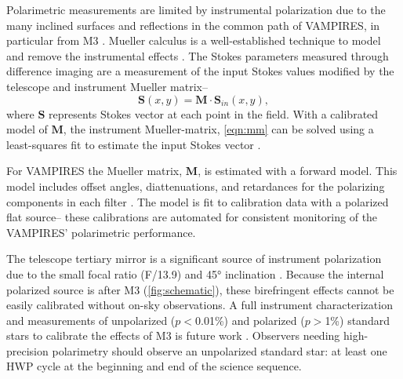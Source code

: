 Polarimetric measurements are limited by instrumental polarization due to the many inclined surfaces and reflections in the common path of VAMPIRES, in particular from M3 \citep{tinbergen_accurate_2007}. Mueller calculus is a well-established technique to model and remove the instrumental effects \citep{perrin_polarimetry_2015,holstein_polarimetric_2020,joost_t_hart_full_2021}. The Stokes parameters measured through difference imaging are a measurement of the input Stokes values modified by the telescope and instrument Mueller matrix--
\begin{equation}
    \mathbf{S}(x, y) = \mathbf{M}\cdot\mathbf{S}_{in}(x, y),
    \label{eqn:mm}
\end{equation}
where $\mathbf{S}$ represents Stokes vector at each point in the field. With a calibrated model of $\mathbf{M}$, the instrument Mueller-matrix, \autoref{eqn:mm} can be solved using a least-squares fit to estimate the input Stokes vector \citep{perrin_polarimetry_2015}.

For VAMPIRES the Mueller matrix, $\mathbf{M}$, is estimated with a forward model. This model includes offset angles, diattenuations, and retardances for the polarizing components in each filter \citep{zhang_characterizing_2023}. The model is fit to calibration data with a polarized flat source-- these calibrations are automated for consistent monitoring of the VAMPIRES' polarimetric performance. 

The telescope tertiary mirror is a significant source of instrument polarization due to the small focal ratio (F/13.9) and \ang{45} inclination \citep{schmid_spherezimpol_2018,van_holstein_polarization-dependent_2023}. Because the internal polarized source is after M3 (\autoref{fig:schematic}), these birefringent effects cannot be easily calibrated without on-sky observations. A full instrument characterization and measurements of unpolarized ($p<$0.01\%) and polarized ($p>$1\%) standard stars to calibrate the effects of M3 is future work \citep{zhang_characterizing_2023}. Observers needing high-precision polarimetry should observe an unpolarized standard star: at least one HWP cycle at the beginning and end of the science sequence.


